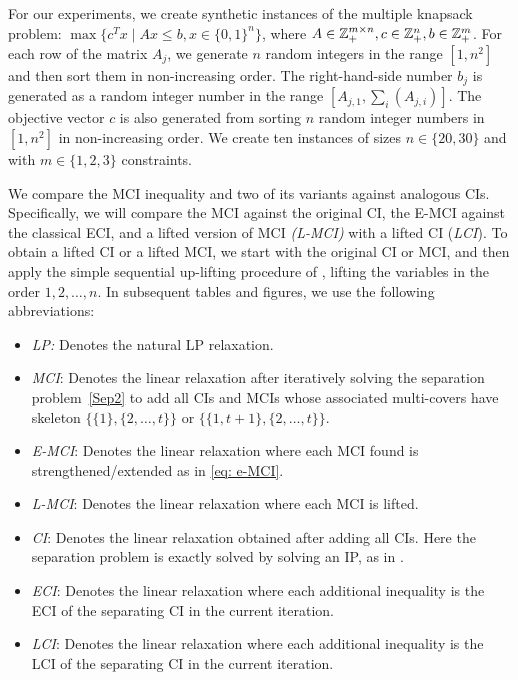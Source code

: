 For our experiments, we create synthetic instances of the multiple knapsack problem: $\max\{c^T x \mid Ax \leq b, x \in \{0,1\}^n\}$, where $A \in \mathbb{Z}^{m \times n}_+, c \in \mathbb{Z}^n_+, b \in \mathbb{Z}^m_+$.
For each row of the matrix $A_j$, we generate $n$ random integers in the range $[1, n^2]$ and then sort them in non-increasing order.
The right-hand-side number $b_j$ is generated as a random integer number in the range $[A_{j,1}, \sum_i (A_{j,i})]$.
The objective vector $c$ is also generated from sorting $n$ random integer numbers in $[1, n^2]$ in non-increasing order. 
We create ten instances of sizes $n \in \{20,30\}$ and with $m \in \{1,2,3\}$ constraints.

We compare the MCI inequality and two of its variants against analogous CIs.  Specifically, we will compare the MCI against the original CI, the E-MCI against the classical ECI, and a lifted version of MCI \emph{(L-MCI)} with a lifted CI (\emph{LCI}).
To obtain a lifted CI or a lifted MCI, we start with the original CI or MCI, and then apply the simple sequential up-lifting procedure of \cite{padberg1975note}, lifting the variables in the order $1,2,\ldots,n$.  In subsequent tables and figures, we use the following abbreviations:

\begin{itemize}
    \item[] \emph{LP:} \quad Denotes the natural LP relaxation.
    \item[] \emph{MCI}: \quad Denotes the linear relaxation after iteratively solving the separation problem~\eqref{Sep2} to add all CIs and MCIs whose associated multi-covers have skeleton $\{\{1\}, \{2, \ldots, t\}\}$ or $\{\{1,t+1\}, \{2, \ldots, t\}\}$.
    \item[] \emph{E-MCI}: \quad Denotes the linear relaxation where each MCI found is strengthened/extended as in \eqref{eq: e-MCI}.
    \item[] \emph{L-MCI}: Denotes the linear relaxation where each MCI is lifted.
    \item[]  \emph{CI}: \quad Denotes the linear relaxation obtained after adding all CIs. Here the separation problem is exactly solved by solving an IP, as in  \cite{crowder1983solving}.
    \item[]  \emph{ECI}: \quad Denotes the linear relaxation where each additional inequality is the ECI of the separating CI in the current iteration.
    \item[]  \emph{LCI}: \quad Denotes the linear relaxation where each additional inequality is the LCI of the separating CI in the current iteration.  
\end{itemize}

